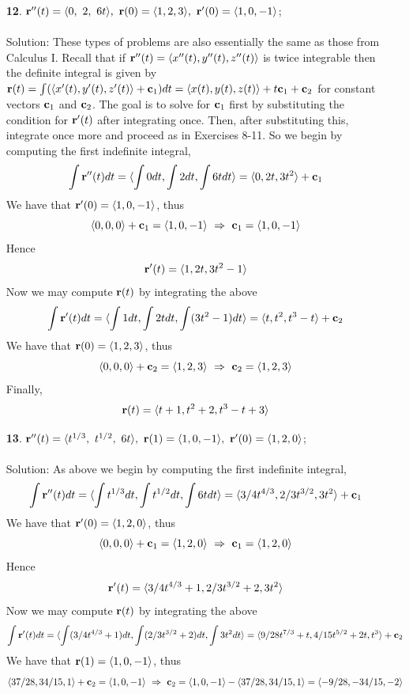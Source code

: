 \documentclass[12pt]{amsbook}
\newcommand{\la}{\langle}
\newcommand{\ra}{\rangle}
\begin{document}
\begin{enumerate}
  \item[{\small\bf 12}.] ${\bf r}''(t)=\la 0 ,\ 2 ,\  6t \ra, \ {\bf r}(0)=\la 1,2,3 \ra, \ {\bf r}'(0)=\la 1,0,-1 \ra$;
  \\
  \\
  {\sc Solution}: These types of problems are also essentially the same as those from Calculus I. Recall that if ${\bf r}''(t)=\la x''(t),y''(t),z''(t) \ra$ is twice integrable then the definite integral is given by ${\bf r}(t)=\int (\la x'(t),y'(t),z'(t)\ra +{\bf c}_1) dt=\la x(t),y(t),z(t) \ra +t{\bf c}_1+{\bf c}_2$ for constant vectors ${\bf c}_1$ and ${\bf c}_2$. The goal is to solve for ${\bf c}_1$ first by substituting the condition for ${\bf r}'(t)$ after integrating once. Then, after substituting this, integrate once more and proceed as in Exercises 8-11. So we begin by computing the first indefinite integral,
  $$\int {\bf r}''(t)dt=\la \int 0 dt, \int 2dt, \int 6t dt\ra = \la 0,2t,3t^2 \ra +{\bf c}_1$$
  We have that ${\bf r}'(0)=\la 1,0,-1 \ra$, thus
  $$\la 0,0,0 \ra + {\bf c}_1= \la 1,0,-1 \ra \ \Rightarrow \ {\bf c}_1=\la 1,0,-1 \ra$$
  Hence
  $${\bf r}'(t)=\la 1,2t,3t^2-1 \ra$$
  Now we may compute ${\bf r}(t)$ by integrating the above
  $$\int {\bf r}'(t)dt= \la \int 1dt, \int 2t dt, \int (3t^2-1)dt \ra = \la t,t^2,t^3-t \ra + {\bf c}_2$$
  We have that ${\bf r}(0)=\la 1,2,3 \ra$, thus
  $$\la 0,0,0 \ra + {\bf c}_2= \la 1,2,3 \ra \ \Rightarrow \ {\bf c}_2=\la 1,2,3 \ra$$
  Finally,
  $${\bf r}(t)=\la t+1,t^2+2,t^3-t+3 \ra$$
  \item[{\small\bf 13}.] ${\bf r}''(t)=\la t^{1/3},\ t^{1/2},\ 6t \ra, \ {\bf r}(1)=\la 1,0,-1 \ra, \ {\bf r}'(0)=\la 1,2,0 \ra$;
  \\
  \\
  {\sc Solution}: As above we begin by computing the first indefinite integral,
  $$\int {\bf r}''(t)dt=\la \int t^{1/3} dt, \int t^{1/2}dt, \int 6t dt\ra = \la 3/4t^{4/3},2/3t^{3/2},3t^2 \ra +{\bf c}_1$$
  We have that ${\bf r}'(0)=\la 1,2,0 \ra$, thus
  $$\la 0,0,0 \ra + {\bf c}_1= \la 1,2,0 \ra \ \Rightarrow \ {\bf c}_1=\la 1,2,0 \ra$$
  Hence
  $${\bf r}'(t)=\la 3/4t^{4/3}+1,2/3t^{3/2}+2,3t^2 \ra$$
  Now we may compute ${\bf r}(t)$ by integrating the above
  $$\int {\bf r}'(t)dt= \la \int (3/4t^{4/3}+1)dt, \int (2/3t^{3/2}+2) dt, \int 3t^2dt \ra = \la 9/28t^{7/3}+t,4/15t^{5/2}+2t,t^3 \ra + {\bf c}_2$$
  We have that ${\bf r}(1)=\la 1,0,-1 \ra$, thus
  $$\la 37/28,34/15,1 \ra + {\bf c}_2= \la 1,0,-1 \ra \ \Rightarrow \ {\bf c}_2=\la 1,0,-1 \ra - \la 37/28,34/15,1\ra = \la -9/28, -34/15 , -2\ra$$

\end{enumerate}
\end{document}

